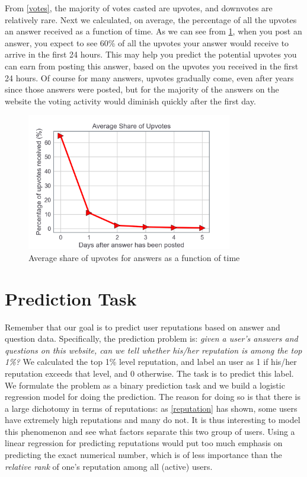 \documentclass[12pt]{article}
\begin{document}
From \cref{votes}, the majority of votes casted are upvotes, and downvotes are relatively rare. Next we calculated, on average, the percentage of all the upvotes an answer received as a function of time. As we can see from \cref{average-vote-time}, when you post an answer, you expect to see 60\% of all the upvotes your answer would receive to arrive in the first 24 hours. This may help you predict the potential upvotes you can earn from posting this answer, based on the upvotes you received in the first 24 hours. Of course for many answers, upvotes gradually come, even after years since those answers were posted, but for the majority of the answers on the website the voting activity would diminish quickly after the first day.
\begin{figure}
\centering
\includegraphics[width=0.8\textwidth]{figures/average-upvotes.png}
\caption{Average share of upvotes for answers as a function of time}
\label{average-vote-time}
\end{figure}

\section{Prediction Task}\label{sec:task}
Remember that our goal is to predict user reputations based on answer and question data. Specifically, the prediction problem is: \emph{given a user's answers and questions on this website, can we tell whether his/her reputation is among the top 1\%?} We calculated the top 1\% level reputation, and label an user as 1 if his/her reputation exceeds that level, and 0 otherwise. The task is to predict this label. We formulate the problem as a binary prediction task and we build a logistic regression model for doing the prediction. The reason for doing so is that there is a large dichotomy in terms of reputations: as \cref{reputation} has shown, some users have extremely high reputations and many do not. It is thus interesting to model this phenomenon and see what factors separate this two group of users. Using a linear regression for predicting reputations would put too much emphasis on predicting the exact numerical number, which is of less importance than the \emph{relative rank} of one's reputation among all (active) users. 
\end{document}
